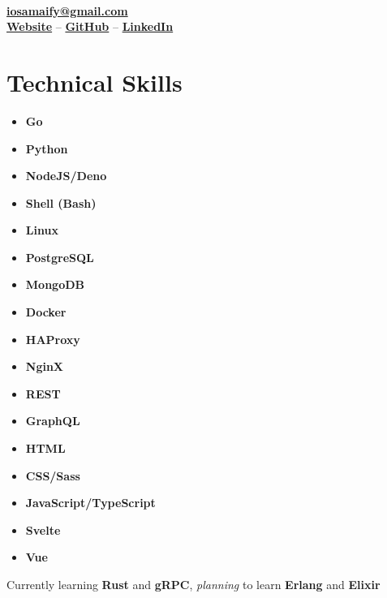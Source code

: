 \documentclass[letterpaper, 10pt]{article}
\author{Osama Muhammad}
\date{\today}
\makeatletter
\renewcommand{\maketitle}{
	\vspace{1.5em}
	\begin{center}
		\par{\huge\bfseries{\theauthor}}
		\vspace{0.7em}\\
		\href{mailto:iosamaify@gmail.com}{\textbf{iosamaify@gmail.com}}
		\vspace{0.7em}\\
		\href{https://osamai.github.io}{\textbf{Website}} --
		\href{https://github.com/osamai}{\textbf{GitHub}} --
		\href{https://www.linkedin.com/in/iosama}{\textbf{LinkedIn}}
	\end{center}
}
\newcommand{\hr}{\par{\vspace{-.3\ht\strutbox}\noindent\hrulefill\par}}
\makeatother
\begin{document}
\maketitle

\hr

\section{Technical Skills}

\begin{multicols}{3}
	\begin{itemize}
		\item \textbf{Go}
		\item \textbf{Python}
		\item \textbf{NodeJS/Deno}
		\item \textbf{Shell (Bash)}
		\item \textbf{Linux}
		\item \textbf{PostgreSQL}
		\item \textbf{MongoDB}
		\item \textbf{Docker}
		\item \textbf{HAProxy}
		\item \textbf{NginX}
		\item \textbf{REST}
		\item \textbf{GraphQL}
		\item \textbf{HTML}
		\item \textbf{CSS/Sass}
		\item \textbf{JavaScript/TypeScript}
		\item \textbf{Svelte}
		\item \textbf{Vue}
	\end{itemize}
\end{multicols}

Currently learning \textbf{Rust} and \textbf{gRPC}, \textit{planning} to learn \textbf{Erlang} and \textbf{Elixir}
\end{document}
